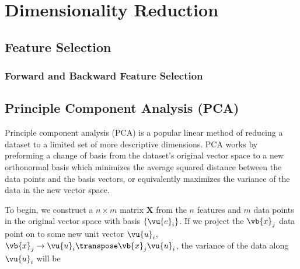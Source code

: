 \chapter{Dimensionality Reduction}
\label{chap:dim_reduct}

\section{Feature Selection}
\label{dim_reduct:feature_selection}

\subsection{Forward and Backward Feature Selection}
\label{dim_reduct:feature_selection:forward_backward}

\section{Principle Component Analysis (PCA)}
\label{dim_reduct:PCA}

Principle component analysis (PCA) \cite{pca} is a popular linear method
of reducing a dataset to a limited set of more descriptive dimensions.
PCA works by preforming a change of basis from
the dataset's original vector space to a new orthonormal basis which
minimizes the average squared distance between the data points and the basis vectors,
or equivalently maximizes the variance of the data in the new vector space.

To begin, we construct a $n \times m$ matrix $\mathbf{X}$
from the $n$ features and $m$ data points in the original vector space
with basis $\left\{\vu{e}_{i}\right\}$.
If we project the $\vb{x}_{j}$ data point on to
some new unit vector $\vu{u}_{i}$,
$\vb{x}_{j} \to \vu{u}_{i}\transpose \vb{x}_{j} \vu{u}_{i}$,
the variance of the data along $\vu{u}_{i}$ will be

